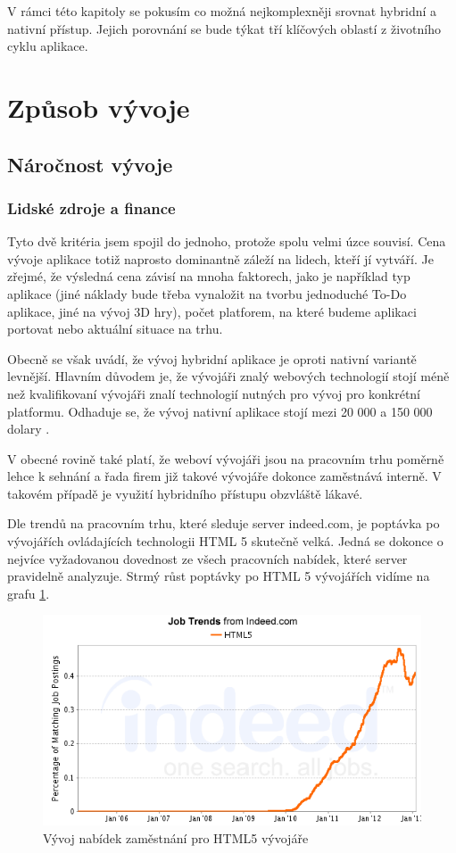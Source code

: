 V rámci této kapitoly se pokusím co možná nejkomplexněji srovnat hybridní a nativní přístup. Jejich porovnání se bude týkat tří klíčových oblastí z životního cyklu aplikace.

\section{Způsob vývoje}
\subsection{Náročnost vývoje}
\subsubsection{Lidské zdroje a finance}
Tyto dvě kritéria jsem spojil do jednoho, protože spolu velmi úzce souvisí. Cena vývoje aplikace totiž naprosto dominantně záleží na lidech, kteří jí vytváří. Je zřejmé, že výsledná cena závisí na mnoha faktorech, jako je například typ aplikace (jiné náklady bude třeba vynaložit na tvorbu jednoduché To-Do aplikace, jiné na vývoj 3D hry), počet platforem, na které budeme aplikaci portovat nebo aktuální situace na trhu.

Obecně se však uvádí, že vývoj hybridní aplikace je oproti nativní variantě levnější. Hlavním důvodem je, že vývojáři znalý webových technologií stojí méně než kvalifikovaní vývojáři znalí technologií nutných pro vývoj pro konkrétní platformu. Odhaduje se, že vývoj nativní aplikace stojí mezi 20 000 a 150 000 dolary \cite{mrc_native_wrong_choice}.

V obecné rovině také platí, že weboví vývojáři jsou na pracovním trhu poměrně lehce k sehnání a řada firem již takové vývojáře dokonce zaměstnává interně. V takovém případě je využití hybridního přístupu obzvláště lákavé.

Dle trendů na pracovním trhu, které sleduje server indeed.com, je poptávka po vývojářích ovládajících technologii HTML 5 skutečně velká. Jedná se dokonce o nejvíce vyžadovanou dovednost ze všech pracovních nabídek, které server pravidelně analyzuje. Strmý růst poptávky po HTML 5 vývojářích vidíme na grafu \ref{fig:HTML5Jobs}.

\begin{figure}\centering
\includegraphics[width=1.0\textwidth]{jobgraph_html5.png}
\caption{Vývoj nabídek zaměstnání pro HTML5 vývojáře \cite{job_indeed}}
\label{fig:HTML5Jobs}
\end{figure}

